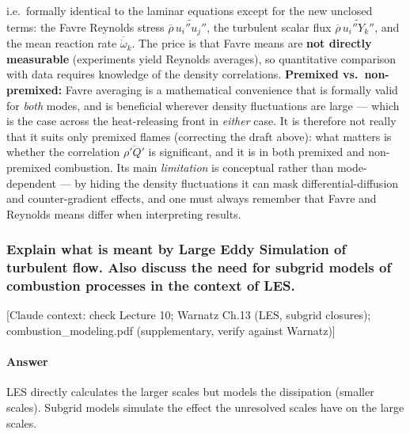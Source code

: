 {i.e.\ formally identical to the laminar equations except for the new unclosed terms: the Favre Reynolds stress $\overline{\rho}\,\widetilde{u_i''u_j''}$, the turbulent scalar flux $\overline{\rho}\,\widetilde{u_i''Y_k''}$, and the mean reaction rate $\overline{\dot\omega}_k$. The price is that Favre means are \textbf{not directly measurable} (experiments yield Reynolds averages), so quantitative comparison with data requires knowledge of the density correlations. \textbf{Premixed vs.\ non-premixed:} Favre averaging is a mathematical convenience that is formally valid for \emph{both} modes, and is beneficial wherever density fluctuations are large --- which is the case across the heat-releasing front in \emph{either} case. It is therefore not really that it suits only premixed flames (correcting the draft above): what matters is whether the correlation $\overline{\rho' Q'}$ is significant, and it is in both premixed and non-premixed combustion. Its main \emph{limitation} is conceptual rather than mode-dependent --- by hiding the density fluctuations it can mask differential-diffusion and counter-gradient effects, and one must always remember that Favre and Reynolds means differ when interpreting results.
}

\subsubsection{Explain what is meant by Large Eddy Simulation of turbulent flow. Also discuss the need for subgrid models of combustion processes in the context of LES.}

{\color{gray}\footnotesize [Claude context: check Lecture 10; Warnatz Ch.13 (LES, subgrid closures); combustion\_modeling.pdf (supplementary, verify against Warnatz)]}


\label{Q:LES}

\paragraph{Answer} LES directly calculates the larger scales but models the dissipation (smaller scales). Subgrid models simulate the effect the unresolved scales have on the large scales.


